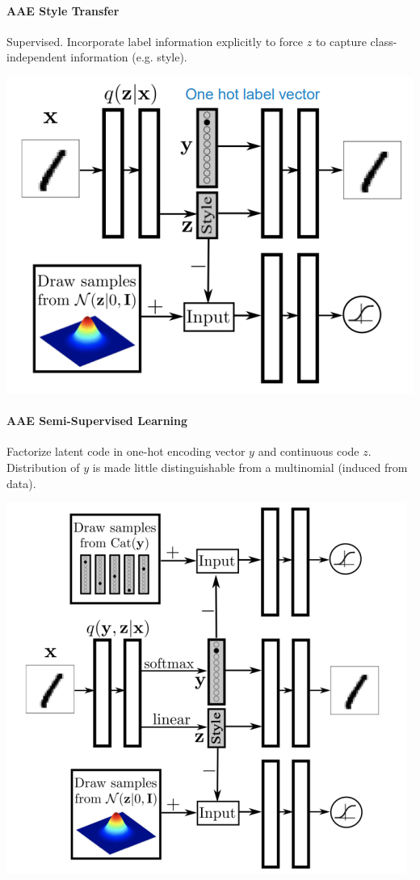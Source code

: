 \documentclass[10pt]{report}
\begin{document}
\paragraph{AAE Style Transfer} Supervised. Incorporate label information explicitly to force $z$ to capture class-independent information (e.g. style).
\begin{center}
	\includegraphics[scale=0.5]{158.png}
\end{center}
\paragraph{AAE Semi-Supervised Learning} Factorize latent code in one-hot encoding vector $y$ and continuous code $z$.\\
Distribution of $y$ is made little distinguishable from a multinomial (induced from data).
\begin{center}
	\includegraphics[scale=0.5]{159.png}
\end{center}
\end{document}
